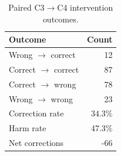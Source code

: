 \begin{table}[t]
\caption{Paired C3$\rightarrow$C4 intervention outcomes.}
\label{tab:interventions}
\centering
\small
\begin{tabular}{lr}
\toprule
Outcome & Count \\
\midrule
Wrong $\rightarrow$ correct & 12 \\
Correct $\rightarrow$ correct & 87 \\
Correct $\rightarrow$ wrong & 78 \\
Wrong $\rightarrow$ wrong & 23 \\
\midrule
Correction rate & 34.3\% \\
Harm rate & 47.3\% \\
Net corrections & -66 \\
\bottomrule
\end{tabular}
\end{table}
